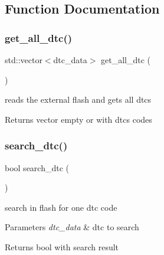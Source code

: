 \subsection{Function Documentation}
\mbox{\label{group__DTC__IO_gaab691651197bbc8afd5b5beece67a868}} 
\subsubsection{\texorpdfstring{get\+\_\+all\+\_\+dtc()}{get\_all\_dtc()}}
{\footnotesize\ttfamily std\+::vector$<$dtc\+\_\+data$>$ get\+\_\+all\+\_\+dtc (\begin{DoxyParamCaption}{ }\end{DoxyParamCaption})}



reads the external flash and gets all dtcs 

\begin{DoxyReturn}{Returns}
vector empty or with dtc\textquotesingle{}s codes 
\end{DoxyReturn}
\mbox{\label{group__DTC__IO_ga37ca84720c4efbecb79dbbc84e088271}} 
\subsubsection{\texorpdfstring{search\+\_\+dtc()}{search\_dtc()}}
{\footnotesize\ttfamily bool search\+\_\+dtc (\begin{DoxyParamCaption}\item[{dtc\+\_\+data}]{ }\end{DoxyParamCaption})}



search in flash for one dtc code 


\begin{DoxyParams}{Parameters}
{\em dtc\+\_\+data} & dtc to search \\
\hline
\end{DoxyParams}
\begin{DoxyReturn}{Returns}
bool with search result 
\end{DoxyReturn}
\mbox{\label{group__DTC__IO_gabc6581eb5f29d4e8aa0e9759368a12b8}} 
